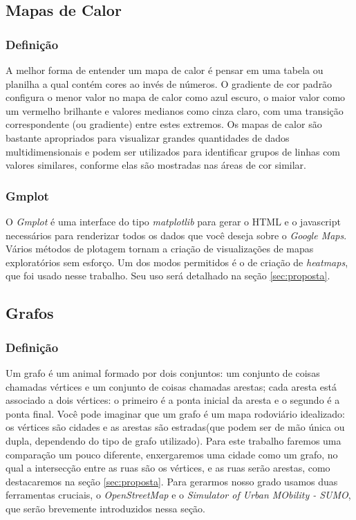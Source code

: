 \subsection{Mapas de Calor}
    \subsubsection{Definição}
    A melhor forma de entender um mapa de calor é pensar em uma tabela ou planilha a qual contém cores ao invés de números. O gradiente de cor padrão configura o menor valor no mapa de calor como azul escuro, o maior valor como um vermelho brilhante e valores medianos como cinza claro, com uma transição correspondente (ou gradiente) entre estes extremos. Os mapas de calor são bastante apropriados para visualizar grandes quantidades de dados multidimensionais e podem ser utilizados para identificar grupos de linhas com valores similares, conforme elas são mostradas nas áreas de cor similar.
    
    \subsubsection{Gmplot}
    O \emph{Gmplot} é uma interface do tipo \emph{matplotlib} para gerar o HTML e o javascript necessários para renderizar todos os dados que você deseja sobre o \emph{Google Maps}. Vários métodos de plotagem tornam a criação de visualizações de mapas exploratórios sem esforço. Um dos modos permitidos é o de criação de \emph{heatmaps}, que foi usado nesse trabalho. Seu uso será detalhado na seção \ref{sec:proposta}.
    
\subsection{Grafos}
    \subsubsection{Definição}
    Um grafo é um animal formado por dois conjuntos:  um conjunto de coisas chamadas vértices e um conjunto de coisas chamadas arestas;  cada aresta está associado a dois vértices:  o primeiro é a ponta inicial da aresta e o segundo é a ponta final.  Você pode imaginar que um grafo é um mapa rodoviário idealizado:  os vértices são cidades e as arestas são estradas(que podem ser de mão única ou dupla, dependendo do tipo de grafo utilizado). Para este trabalho faremos uma comparação um pouco diferente, enxergaremos uma cidade como um grafo, no qual a intersecção entre as ruas são os vértices, e as ruas serão arestas, como destacaremos na seção \ref{sec:proposta}. Para gerarmos nosso grado usamos duas ferramentas cruciais, o \emph{OpenStreetMap} e o \emph{Simulator of Urban MObility - SUMO}, que serão brevemente introduzidos nessa seção.
    
